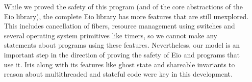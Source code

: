 While we proved the safety of this program (and of the core abstractions of the Eio library), the complete Eio library has more features that are still unexplored.
This includes cancellation of fibers, resource management using switches and several operating system primitives like timers, so we cannot make any statements about programs using these features.
Nevertheless, our model is an important step in the direction of proving the safety of Eio and programs that use it.
Iris along with its features like ghost state and shareable invariants to reason about multithreaded and stateful code were key in this development.

